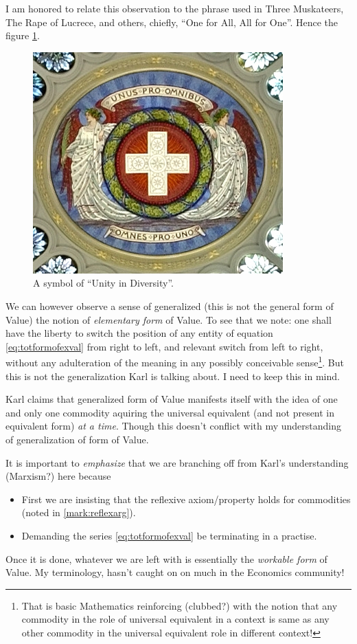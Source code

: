 \documentclass[12pt]{extarticle}
\theoremstyle{definition}
\begin{document}
 I am honored to relate this observation to the phrase used in Three Muskateers, The Rape of Lucrece, and others, chiefly, ``One for All, All for One''.  Hence the figure \ref{fig:alloneall}.
 \begin{figure}
   \centering
   \includegraphics[scale=3.5]{Unus_pro_omnibus,_omnes_pro_uno}
   \caption{A symbol of ``Unity in Diversity''.}
    \label{fig:alloneall}
  \end{figure}

  We can however observe a sense of generalized (this is not the general form of Value) the notion of \emph{elementary form} of Value.  To see that we note:  one shall have the liberty to switch the position of any entity of equation \ref{eq:totformofexval} from right to left, and relevant switch from left to right, without any adulteration of the meaning in any possibly conceivable sense\footnote{That is basic Mathematics reinforcing (clubbed?) with the notion that any commodity in the role of universal equivalent in a context is same as any other commodity in the universal equivalent role in different context!}.  But this is not the generalization Karl is talking about.  I need to keep this in mind.

  Karl claims that generalized form of Value manifests itself with the idea of one and only one commodity aquiring the universal equivalent (and not present in equivalent form) \emph{at a time}.  Though this doesn't conflict with my understanding of generalization of form of Value.

  It is important to \emph{emphasize} that we are branching off from Karl's understanding (Marxism?) here because
 \begin{itemize}
  \item First we are insisting that the reflexive axiom/property holds for commodities (noted in \ref{mark:reflexarg}).
  \item Demanding the series \ref{eq:totformofexval} be terminating in a practise. 
  \end{itemize}
  Once it is done, whatever we are left with is essentially the \emph{workable form} of Value.  My terminology, hasn't caught on on much in the Economics community!
\end{document}
